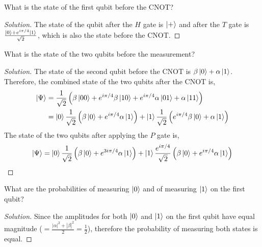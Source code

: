 \begin{solution}[label=ques:3a]
  \begin{question}
    What is the state of the first qubit before the CNOT?
  \end{question}
  \tcblower{}
  \begin{proof}[Solution]
    The state of the qubit after the $H$ gate is $\ket{+}$ and after the $T$ gate is $\frac{\ket{0} + e^{i\pi/4}\ket{1}}{\sqrt{2}}$, which is also the state before the CNOT.
  \end{proof}
\end{solution}

\begin{solution}[label=ques:3b]
  \begin{question}
    What is the state of the two qubits before the measurement?
  \end{question}
  \tcblower{}
  \begin{proof}[Solution]
    The state of the second qubit before the CNOT is $\beta\ket{0} + \alpha\ket{1}$. Therefore, the combined state of the two qubits after the CNOT is,
    \begin{equation}
      \begin{split}
        \ket{\Psi} &= \frac{1}{\sqrt{2}}\left(\beta\ket{00} + e^{i\pi/4}\beta\ket{10} + e^{i\pi/4}\alpha\ket{01} + \alpha\ket{11}\right)\\
        &= \ket{0}\frac{1}{\sqrt{2}}\left(\beta\ket{0} + e^{i\pi/4}\alpha\ket{1}\right) + \ket{1}\frac{1}{\sqrt{2}}\left(e^{i\pi/4}\beta\ket{0} + \alpha\ket{1}\right)
      \end{split}
    \end{equation}
    The state of the two qubits after applying the $P$ gate is,
    \begin{equation}
      \ket{\Psi} = \ket{0}\frac{1}{\sqrt{2}}\left(\beta\ket{0} + e^{3i\pi/4}\alpha\ket{1}\right) + \ket{1}\frac{e^{i\pi/4}}{\sqrt{2}}\left(\beta\ket{0} + e^{i\pi/4}\alpha\ket{1}\right)
    \end{equation}
  \end{proof}
\end{solution}

\begin{solution}[label=ques:3c]
  \begin{question}
    What are the probabilities of measuring $\ket{0}$ and of measuring $\ket{1}$ on the first qubit?
  \end{question}
  \tcblower{}
  \begin{proof}[Solution]
    Since the amplitudes for both $\ket{0}$ and $\ket{1}$ on the first qubit have equal magnitude ($= \frac{|\alpha|^2 + |\beta|^2}{2} = \frac{1}{2}$), therefore the probability of measuring both states is equal.
  \end{proof}
\end{solution}

